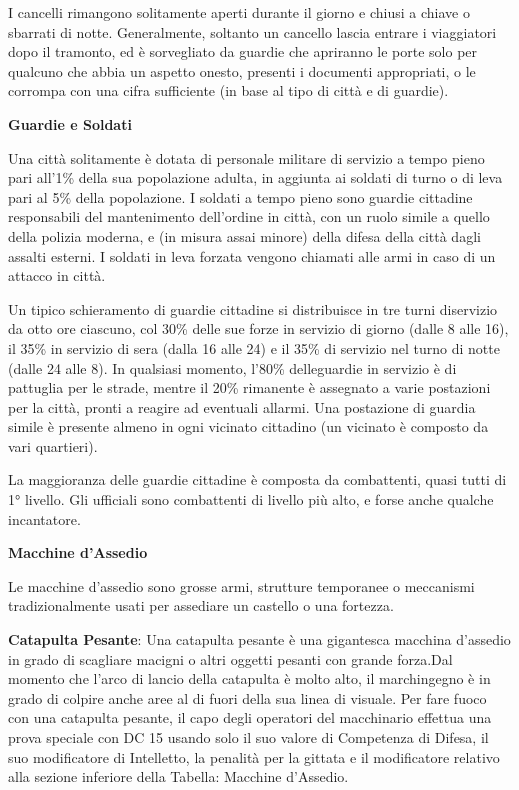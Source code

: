 \documentclass[a4paper,11pt,twoside,openany]{book}
\begin{document}
I cancelli rimangono solitamente aperti durante il giorno e chiusi a chiave o sbarrati di notte. Generalmente, soltanto un cancello lascia entrare i viaggiatori dopo il tramonto, ed è sorvegliato da guardie che apriranno le porte solo per qualcuno che abbia un aspetto onesto, presenti i documenti appropriati, o le corrompa con una cifra sufficiente (in base al tipo di città e di guardie).

\textbf{Guardie e Soldati}

Una città solitamente è dotata di personale militare di servizio a tempo pieno pari all'1\% della sua popolazione adulta, in aggiunta ai soldati di turno o di leva pari al 5\% della popolazione. I soldati a tempo pieno sono guardie cittadine responsabili del mantenimento dell'ordine in città, con un ruolo simile a quello della polizia moderna, e (in misura assai minore) della difesa della città dagli assalti esterni. I soldati in leva forzata vengono chiamati alle armi in caso di un attacco in città.

Un tipico schieramento di guardie cittadine si distribuisce in tre turni diservizio da otto ore ciascuno, col 30\% delle sue forze in servizio di giorno (dalle 8 alle 16), il 35\% in servizio di sera (dalla 16 alle 24) e il 35\% di servizio nel turno di notte (dalle 24 alle 8). In qualsiasi momento, l'80\% delleguardie in servizio è di pattuglia per le strade, mentre il 20\% rimanente è assegnato a varie postazioni per la città, pronti a reagire ad eventuali allarmi. Una postazione di guardia simile è presente almeno in ogni vicinato cittadino (un vicinato è composto da vari quartieri).

La maggioranza delle guardie cittadine è composta da combattenti, quasi tutti di 1° livello. Gli ufficiali sono combattenti di livello più alto, e forse anche qualche incantatore.

\textbf{Macchine d'Assedio}

Le macchine d'assedio sono grosse armi, strutture temporanee o meccanismi tradizionalmente usati per assediare un castello o una fortezza.

\textbf{Catapulta Pesante}: Una catapulta pesante è una gigantesca macchina d'assedio in grado di scagliare macigni o altri oggetti pesanti con grande forza.Dal momento che l'arco di lancio della catapulta è molto alto, il marchingegno è in grado di colpire anche aree al di fuori della sua linea di visuale. Per fare fuoco con una catapulta pesante, il capo degli operatori del macchinario effettua una prova speciale con DC 15 usando solo il suo valore di Competenza di Difesa, il suo modificatore di Intelletto, la penalità per la gittata e il modificatore relativo alla sezione inferiore della Tabella: Macchine d'Assedio.
\end{document}
